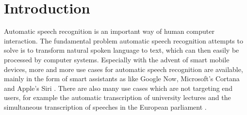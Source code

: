 
\chapter{Introduction}
\label{ch:Introduction}

Automatic speech recognition is an important way of human computer interaction. The fundamental problem automatic speech recognition attempts to solve is to transform natural spoken language to text, which can then easily be processed by computer systems. Especially with the advent of smart mobile devices, more and more use cases for automatic speech recognition are available, mainly in the form of smart assistants as like   Google Now, Microsoft's Cortana and Apple's Siri \cite{yu2016automatic} \cite{lopez2017alexa}. There are also many use cases which are not targeting end users, for example the automatic transcription of university lectures \cite{muller2016lecture} and the simultaneous transcription of speeches in the European parliament \cite{stuker2007isl}.

